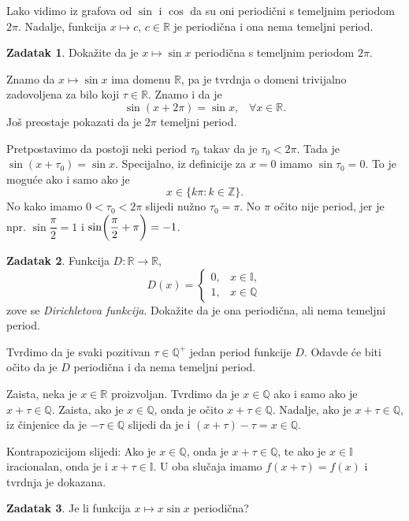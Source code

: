 \documentclass{book}
\let\originalleft\left
\let\originalright\right
\renewcommand{\left}{\mathopen{}\mathclose\bgroup\originalleft}
\renewcommand{\right}{\aftergroup\egroup\originalright}
\renewenvironment{proof}{%
    \vspace{-\parskip}\begin{oldproof}%
    }{%
    \end{oldproof}%
}
\theoremstyle{definition}
\theoremstyle{definition}
\newtheorem{exercise}{Zadatak}
\theoremstyle{remark}
\begin{document}
Lako vidimo iz grafova od $\sin$ i $\cos$ da su oni periodični s temeljnim periodom $2\pi$. Nadalje, funkcija $x\mapsto c$, $c\in \mathbb{R}$ je periodična i ona nema temeljni period.
\begin{exercise}
Dokažite da je $x\mapsto \sin{x}$ periodična s temeljnim periodom $2\pi$.
\end{exercise}
\begin{proof}[Rješenje]
Znamo da $x\mapsto \sin{x}$ ima domenu $\mathbb{R}$, pa je tvrdnja o domeni trivijalno zadovoljena za bilo koji $\tau\in \mathbb{R}$. Znamo i da je $$\sin(x+2\pi)=\sin{x},\;\;\; \forall x\in \mathbb{R}.$$ Još preostaje pokazati da je $2\pi$ temeljni period. 

Pretpostavimo da postoji neki period $\tau_0$ takav da je $\tau_0<2\pi$. Tada je $\sin(x+\tau_0)=\sin{x}$. Specijalno, iz definicije za $x=0$ imamo $\sin{\tau_0}=0$. To je moguće ako i samo ako je $$x\in \{k\pi : k\in \mathbb{Z}\}.$$ No kako imamo $0<\tau_0<2\pi$ slijedi nužno $\tau_0=\pi$. No $\pi$ očito nije period, jer je npr. $\sin{\dfrac{\pi}{2}}=1$ i $\sin\left(\dfrac{\pi}{2}+\pi\right)=-1$.
\end{proof}
\begin{exercise}
Funkcija $D : \mathbb{R}\to \mathbb{R}$,
$$D(x)=\begin{cases}
0, & x\in \mathbb{I},\\
1, & x\in \mathbb{Q}
\end{cases}$$
zove se \textit{Dirichletova funkcija}. Dokažite da je ona periodična, ali nema temeljni period.
\end{exercise}
\begin{proof}[Rješenje]
Tvrdimo da je svaki pozitivan $\tau\in \mathbb{Q^+}$ jedan period funkcije $D$. Odavde će biti očito da je $D$ periodična i da nema temeljni period.

Zaista, neka je $x\in \mathbb{R}$ proizvoljan. Tvrdimo da je $x\in \mathbb{Q}$ ako i samo ako je $x+\tau\in \mathbb{Q}$. Zaista, ako je $x\in \mathbb{Q}$, onda je očito $x+\tau\in \mathbb{Q}$. Nadalje, ako je $x+\tau\in \mathbb{Q}$, iz činjenice da je $-\tau\in \mathbb{Q}$ slijedi da je i $(x+\tau)-\tau=x\in \mathbb{Q}$.

Kontrapozicijom slijedi: Ako je $x\in \mathbb{Q}$, onda je $x+\tau\in \mathbb{Q}$, te ako je $x\in \mathbb{I}$ iracionalan, onda je i $x+\tau\in \mathbb{I}$. U oba slučaja imamo $f(x+\tau)=f(x)$ i tvrdnja je dokazana.
\end{proof}
\begin{exercise}
Je li funkcija $x\mapsto x\sin{x}$ periodična?
\end{exercise}
\end{document}
